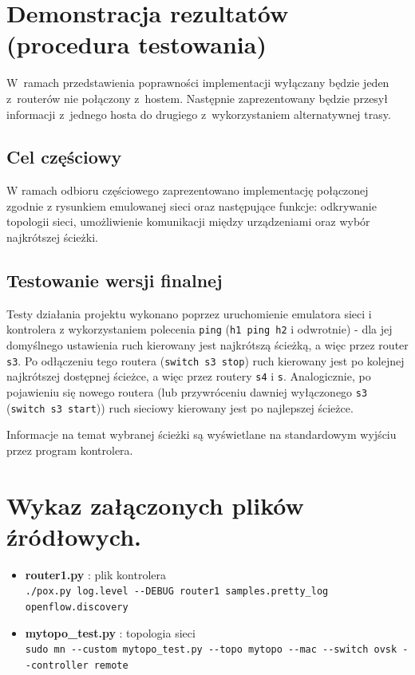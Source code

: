 \documentclass{article}
\begin{document}
	\section{Demonstracja rezultatów (procedura testowania)}
	W~ramach przedstawienia poprawności implementacji wyłączany będzie jeden z~routerów nie połączony z~hostem. Następnie zaprezentowany będzie przesył informacji z~jednego hosta do drugiego z~wykorzystaniem alternatywnej trasy. 
	\subsection{Cel częściowy}
	W ramach odbioru częściowego zaprezentowano implementację połączonej zgodnie z rysunkiem emulowanej sieci oraz następujące funkcje: odkrywanie topologii sieci, umożliwienie komunikacji między urządzeniami oraz wybór najkrótszej ścieżki.
	\subsection{Testowanie wersji finalnej}
	Testy działania projektu wykonano poprzez uruchomienie emulatora sieci i kontrolera z wykorzystaniem polecenia \texttt{ping} (\texttt{h1 ping h2} i odwrotnie) - dla jej domyślnego ustawienia ruch kierowany jest najkrótszą ścieżką, a więc przez router \texttt{s3}. Po odłączeniu tego routera (\verb|switch s3 stop|) ruch kierowany jest po kolejnej najkrótszej dostępnej ścieżce, a więc przez routery \texttt{s4} i \texttt{s}. Analogicznie, po pojawieniu się nowego routera (lub przywróceniu dawniej wyłączonego \texttt{s3} (\verb|switch s3 start|)) ruch sieciowy kierowany jest po najlepszej ścieżce.
	
	Informacje na temat wybranej ścieżki są wyświetlane na standardowym wyjściu przez program kontrolera.
	

	\section{Wykaz załączonych plików źródłowych.}
	\begin{itemize}
		\item \textbf{router1.py} : plik kontrolera \\ 
		\verb|./pox.py log.level --DEBUG router1 samples.pretty_log openflow.discovery|
		\item \textbf{mytopo\_test.py} : topologia sieci \\
		\verb|sudo mn --custom mytopo_test.py --topo mytopo --mac --switch ovsk --controller remote|%
	\end{itemize}
	
\end{document}
